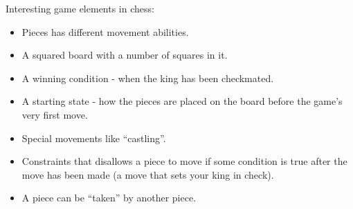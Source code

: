 
Interesting game elements in chess:
\begin{itemize}[noitemsep]
\item Pieces has different movement abilities.
\item A squared board with a number of squares in it.
\item A winning condition - when the king has been checkmated.
\item A starting state - how the pieces are placed on the board before the game's very first move.
\item Special movements like ``castling''.
\item Constraints that disallows a piece to move if some condition is true after the move has been made (a move that sets your king in check).
\item A piece can be ``taken'' by another piece.
\end{itemize}
